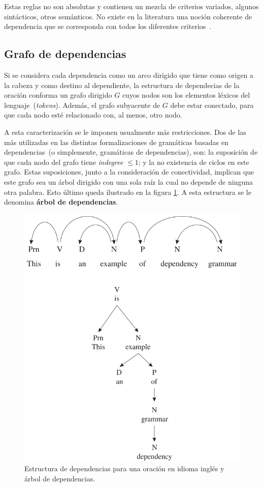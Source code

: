 Estas reglas no son absolutas y contienen un mezcla de criterios variados, algunos sint\'acticos, otros sem\'anticos. No existe en la literatura una noci\'on coherente de dependencia que se corresponda con todos los diferentes criterios~\cite{nivre2005dependency}.


\subsection{Grafo de dependencias}

Si se considera cada dependencia como un arco dirigido que tiene como origen a la cabeza y como destino al dependiente, la estructura de dependecias de la oraci\'on conforma un grafo dirigido $G$ cuyos nodos son los elementos l\'exicos del lenguaje~(\emph{tokens}). Adem\'as, el grafo subyacente de $G$ debe estar conectado, para que cada nodo est\'e relacionado con, al menos, otro nodo.

A esta caracterizaci\'on se le imponen usualmente m\'as restricciones. Dos de las m\'as utilizadas en las distintas formalizaciones de gram\'aticas basadas en dependencias~(o simplemente, gram\'aticas de dependencias), son: la suposici\'on de que cada nodo del grafo tiene \emph{indegree} $\leq 1$; y la no existencia de ciclos en este grafo. Estas suposiciones, junto a la consideraci\'on de conectividad, implican que este grafo sea un \'arbol dirigido con una sola ra\'iz la cual no depende de ninguna otra palabra. Esto \'ultimo queda ilustrado en la figura \ref{fig:dep_tree}. A esta estructura se le denomina \textbf{\'arbol de dependencias}.

\begin{figure}[h!]
	\centering
	\includegraphics[width=0.7\linewidth]{Graphics/dep_tree.png}
	\caption{Estructura de dependencias para una oraci\'on en idioma ingl\'es y \'arbol de dependencias.}\label{fig:dep_tree}
\end{figure}

